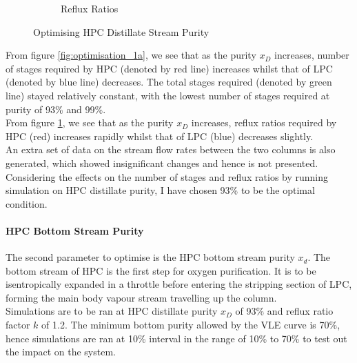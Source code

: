 \documentclass[11pt,oneside]{article}
\let\subsubsubsection\paragraph
\begin{document}
\begin{figure}[ht]
\begin{subfigure}{0.49\textwidth}
            \caption{Reflux Ratios} \label{fig:optimisation_1b}
        \end{subfigure}
        \caption{Optimising HPC Distillate Stream Purity} \label{fig:optimsation_1}
    \end{figure}
	\noindent From figure \ref{fig:optimisation_1a}, we see that as the purity $x_D$ increases, number of stages required by HPC (denoted by red line) increases whilst that of LPC (denoted by blue line) decreases. The total stages required (denoted by green line) stayed relatively constant, with the lowest number of stages required at purity of 93\% and 99\%. \\
	From figure \ref{fig:optimisation_1b}, we see that as the purity $x_D$ increases, reflux ratios required by HPC (red) increases rapidly whilst that of LPC (blue) decreases slightly. \\
	An extra set of data on the stream flow rates between the two columns is also generated, which showed insignificant changes and hence is not presented.\\
	Considering the effects on the number of stages and reflux ratios by running simulation on HPC distillate purity, I have chosen 93\% to be the optimal condition.
	\subsubsubsection{HPC Bottom Stream Purity}
    The second parameter to optimise is the HPC bottom stream purity $x_d$. The bottom stream of HPC is the first step for oxygen purification. It is to be isentropically expanded in a throttle before entering the stripping section of LPC, forming the main body vapour stream travelling up the column. \\
    Simulations are to be ran at HPC distillate purity $x_D$ of 93\% and reflux ratio factor $k$ of 1.2. The minimum bottom purity allowed by the VLE curve is 70\%, hence simulations are ran at 10\% interval in the range of 10\% to 70\% to test out the impact on the system. \\
    
\end{document}
